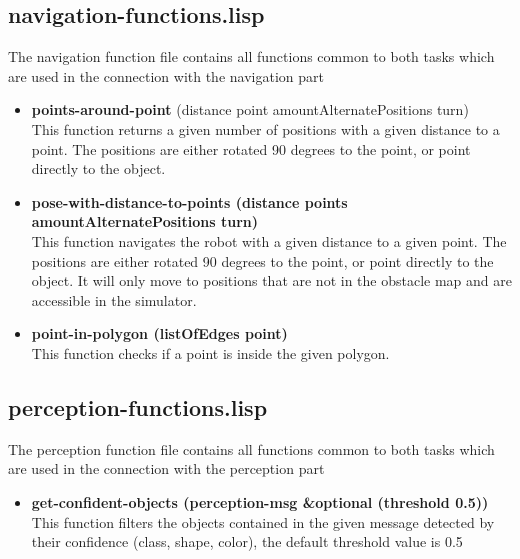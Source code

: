 \documentclass[main.tex]{subfiles}
\begin{document}
	    \subsection{navigation-functions.lisp}
	    The navigation function file contains all functions common to both tasks which are used in the connection with the navigation part
	    \begin{itemize}
	    	\item \textbf{points-around-point} (distance point amountAlternatePositions turn) \\
	    	This function returns a given number of positions with a given distance to a point. The positions are either rotated 90 degrees to the point, or point directly to the object.
	    	\item \textbf{pose-with-distance-to-points (distance points amountAlternatePositions turn)} \\
	    	This function navigates the robot with a given distance to a given point. The positions are either rotated 90 degrees to the point, or point directly to the object. It will only move to positions that are not in the obstacle map and are accessible in the simulator.
	    	\item \textbf{point-in-polygon (listOfEdges point)} \\
			This function checks if a point is inside the given polygon.
	    \end{itemize}
	    \subsection{perception-functions.lisp}
	    The perception function file contains all functions common to both tasks which are used in the connection with the perception part
	    \begin{itemize}
	    	\item \textbf{get-confident-objects (perception-msg \&optional (threshold 0.5))} \\
	    	This function filters the objects contained in the given message detected by their confidence (class, shape, color), the default threshold value is 0.5
	    \end{itemize}
\end{document}
